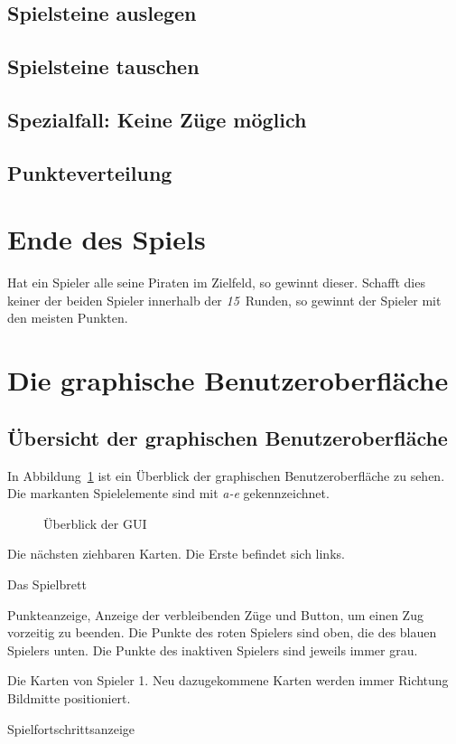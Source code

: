 \documentclass[a4paper, ngerman]{scrartcl}
\newcommand{\RundenAnzahl}{\emph{15}}
\begin{document}
\subsection{Spielsteine auslegen}

	 
\subsection{Spielsteine tauschen}




\subsection{Spezialfall: Keine Züge möglich}

	
\subsection{Punkteverteilung}
	
\section{Ende des Spiels}

	Hat ein Spieler alle seine Piraten im Zielfeld, so gewinnt dieser. Schafft dies
	keiner der beiden Spieler innerhalb der \RundenAnzahl\ Runden, so
	gewinnt der Spieler mit den meisten Punkten.
	
\section{Die graphische Benutzeroberfläche}
\subsection{Übersicht der graphischen Benutzeroberfläche}
	In Abbildung~\ref{fig:GUI} ist ein Überblick der graphischen Benutzeroberfläche
	zu sehen. Die markanten Spielelemente sind mit \emph{a-e} gekennzeichnet.
	
	 \begin{figure}[h!]
		\centering		
		\caption{Überblick der GUI}
		\label{fig:GUI}
	\end{figure}
	
\begin{compactenum}[a)] \item Die nächsten ziehbaren Karten. Die Erste befindet
sich links.
\item Das Spielbrett \item Punkteanzeige, Anzeige der verbleibenden Züge und
Button, um einen Zug vorzeitig zu beenden. Die Punkte des roten Spielers sind
oben, die des blauen Spielers unten. Die Punkte des inaktiven Spielers sind
jeweils immer grau.
\item Die Karten von Spieler 1. Neu dazugekommene Karten werden immer Richtung
Bildmitte positioniert.
\item Spielfortschrittsanzeige
	\end{compactenum}
	
\end{document}
